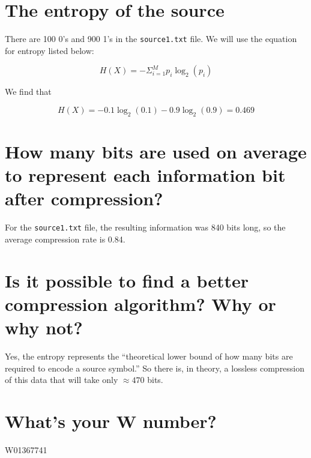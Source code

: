 \documentclass[11pt]{style}
\begin{document}
\maketitle

\section{The entropy of the source}

There are 100 0's and 900 1's in the \verb!source1.txt! file. We will use the equation for
entropy listed below:

\[
  H(X) = - \Sigma_{i=1}^{M} p_i \log_2 ( p_i )
\]

We find that 

\[
  H(X) = - 0.1 \log_2 (0.1) - 0.9 \log_2 ( 0.9 ) = 0.469
\]


\section{How many bits are used on average to represent each information bit after compression?}

For the \verb!source1.txt! file, the resulting information was 840 bits long, so
the average compression rate is 0.84.

\section{Is it possible to find a better compression algorithm? Why or why not?}

Yes, the entropy represents the ``theoretical lower
bound of how many bits are required to encode a source
symbol.'' So there is, in theory, a lossless compression
of this data that will take only $\approx470$ bits.

\section{What’s your W number?}

W01367741
\end{document}

